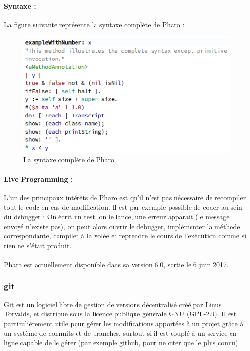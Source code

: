 	\paragraph{Syntaxe :}
	La figure suivante représente la syntaxe complète de Pharo :
	
	\begin{figure}
		\includegraphics[width=12cm]{./img/pharo_syntax.png}
		\caption[pharosyntax]{La syntaxe complète de Pharo}
	\end{figure}

	

	\paragraph{Live Programming :}
	L'un des principaux intérêts de Pharo est qu'il n'est pas nécessaire de recompiler tout le code en cas de modification. Il est par exemple possible de coder au sein du debugger : On écrit un test, on le lance, une erreur apparait (le message envoyé n'existe pas), on peut alors ouvrir le debugger, implémenter la méthode correspondante, compiler à la volée et reprendre le cours de l'exécution comme si rien ne s'était produit.
	
	\paragraph{}
	Pharo est actuellement disponible dans sa version 6.0, sortie le 6 juin 2017.

	\subsubsection{git}
	Git est un logiciel libre de gestion de versions décentralisé créé par Linus Torvalds, et distribué sous la licence publique générale GNU (GPL-2.0). Il est particulièrement utile pour gérer les modifications apportées à un projet grâce à un système de commits et de branches, surtout si il est couplé à un service en ligne capable de le gérer (par exemple github, pour ne citer que le plus connu).
